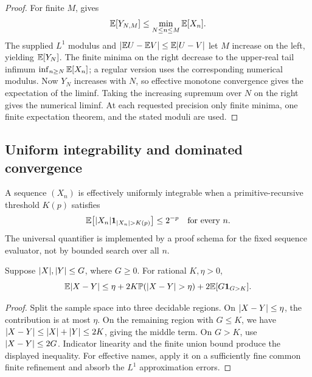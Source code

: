 \begin{proof}
For finite \(M\),  gives
\[
 \mathbb E[Y_{N,M}]
 \le\min_{N\le n\le M}\mathbb E[X_n].
\]
The supplied \(L^1\) modulus and
\(\lvert\mathbb E U-\mathbb E V\rvert\le\mathbb E\lvert U-V\rvert\) let \(M\) increase on the
left, yielding \(\mathbb E[Y_N]\).  The finite minima on the right decrease to the
upper-real tail infimum \(\inf_{n\ge N}\mathbb E[X_n]\); a regular version uses the
corresponding numerical modulus.  Now \(Y_N\) increases with \(N\), so
effective monotone convergence gives the expectation of the liminf.  Taking
the increasing supremum over \(N\) on the right gives the numerical liminf.
At each requested precision only finite minima, one finite expectation theorem,
and the stated moduli are used.
\end{proof}

\subsection{Uniform integrability and dominated convergence}

\begin{definition}\label{def:ui}
A sequence \((X_n)\) is effectively uniformly integrable when a
primitive-recursive threshold \(K(p)\) satisfies
\[
 \mathbb E\bigl[\lvert X_n\rvert\mathbf 1_{\lvert X_n\rvert>K(p)}\bigr]\le2^{-p}
 \quad\text{for every }n.
\]
The universal quantifier is implemented by a proof schema for the fixed
sequence evaluator, not by bounded search over all \(n\).
\end{definition}

\begin{lemma}\label{lem:truncation}
Suppose \(\lvert X\rvert,\lvert Y\rvert\le G\), where \(G\ge0\).  For rational
\(K,\eta>0\),
\[
 \mathbb E\lvert X-Y\rvert
 \le \eta+2K\mathbb P(\lvert X-Y\rvert>\eta)
      +2\mathbb E[G\mathbf 1_{G>K}].
\]
\end{lemma}

\begin{proof}
Split the sample space into three decidable regions.  On
\(\lvert X-Y\rvert\le\eta\), the contribution is at most \(\eta\).  On the remaining
region with \(G\le K\), we have \(\lvert X-Y\rvert\le\lvert X\rvert+\lvert Y\rvert\le2K\), giving the
middle term.  On \(G>K\), use \(\lvert X-Y\rvert\le2G\).  Indicator linearity and the
finite union bound produce the displayed inequality.  For effective names,
apply it on a sufficiently fine common finite refinement and absorb the
\(L^1\) approximation errors.
\end{proof}

